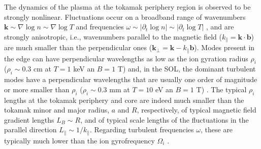 The dynamics of the plasma at the tokamak periphery region is observed to be strongly nonlinear. Fluctuations occur on a broadband range of wavenumbers $\mathbf k\sim \nabla \log n \sim \nabla \log T$ and frequencies $\omega\sim |\partial_t \log n|\sim|\partial_t \log T|$ \citep{Scott2007}, and are strongly anisotropic, i.e., wavenumbers parallel to the magnetic field ($k_\parallel = \mathbf k \cdot \mathbf b$) are much smaller than the perpendicular ones ($\mathbf k_\perp=\mathbf k - k_\parallel \mathbf b$).
%
Modes present in the edge can have perpendicular wavelengths as low as the ion gyration radius $\rho_i$ ($\rho_i\sim 0.3$ cm at $T=1$ keV an $B=1$ T) and, in the SOL, the dominant turbulent modes have a perpendicular wavelengths that are usually one order of magnitude or more smaller than $\rho_i$ ($\rho_i\sim 0.3$ mm at $T=10$ eV an $B=1$ T) \citep{Agostini2011}.
%
The typical $\rho_i$ lengths at the tokamak periphery and core are indeed much smaller than the tokamak minor and major radius, $a$ and $R$, respectively, of typical magnetic field gradient lengths $L_B \sim R$, and of typical scale lengths of the fluctuations in the parallel direction $L_\parallel \sim 1/k_\parallel$.
%
Regarding turbulent frequencies $\omega$, these are typically much lower than the ion gyrofrequency $\Omega_i$ \citep{Hahm2009}.

